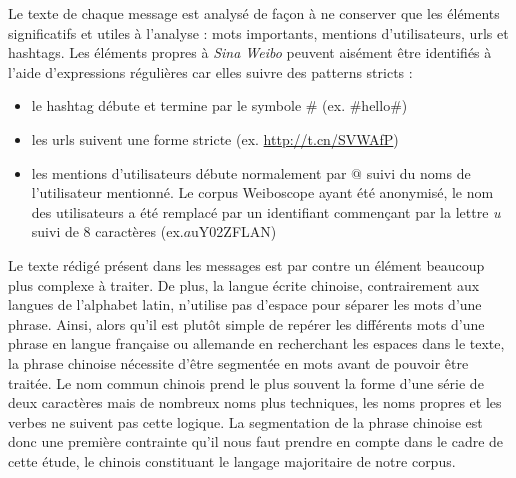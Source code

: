     Le texte de chaque message est analysé de fa\c{c}on à ne conserver que les éléments significatifs et utiles à l'analyse : mots importants, mentions d'utilisateurs, urls et hashtags. Les éléments propres à \textit{Sina Weibo} peuvent aisément être identifiés à l'aide d'expressions régulières car elles suivre des patterns stricts : 

    \begin{itemize}
     \item le hashtag débute et termine par le symbole \# (ex. \#hello\#)
     \item les urls suivent une forme stricte (ex. \url{http://t.cn/SVWAfP}) 
     \item les mentions d'utilisateurs débute normalement par $@$ suivi du noms de l'utilisateur mentionné. Le corpus Weiboscope ayant été anonymisé, le nom des utilisateurs a été remplacé par un identifiant commençant par la lettre \textit{u} suivi de 8 caractères (ex.$a$uY02ZFLAN)
    \end{itemize}


    Le texte rédigé présent dans les messages est par contre un élément beaucoup plus complexe à traiter. De plus, la langue écrite chinoise, contrairement aux langues de l'alphabet latin, n'utilise pas d'espace pour séparer les mots d'une phrase. Ainsi, alors qu'il est plutôt simple de repérer les différents mots d'une phrase en langue française ou allemande en recherchant les espaces dans le texte, la phrase chinoise nécessite d'être segmentée en mots avant de pouvoir être traitée. Le nom commun chinois prend  le plus souvent la forme d'une série de deux caractères mais de nombreux noms plus techniques, les noms propres et les verbes ne suivent pas cette logique. La segmentation de la phrase chinoise est donc une  première contrainte qu'il nous faut prendre en compte dans le cadre de cette étude, le chinois constituant le langage majoritaire de notre corpus. 

